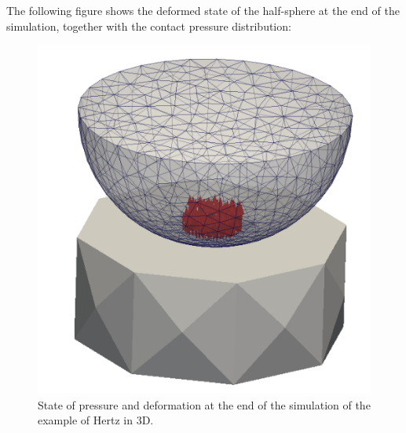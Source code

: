The following figure shows the deformed state of the half-sphere at the end of the simulation, together with the contact pressure distribution:

\begin{figure}[htbp]
\begin{center}
\includegraphics[scale=0.3]{figures/hertz_3D.png}
\caption{State of pressure and deformation at the end of the simulation of the example of Hertz in 3D.}
\label{fig:hertz_3D}
\end{center}
\end{figure}
